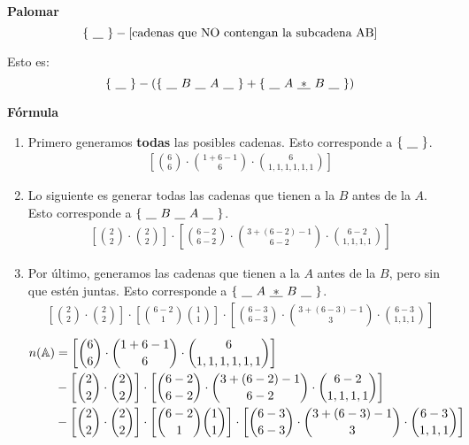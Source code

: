 \textbf{Palomar}
\begin{equation*}
\left\{ ~\underline{\hspace{0.3cm}}~ \right\} - [\text{cadenas que NO contengan la subcadena AB}]
\end{equation*}

Esto es:
\begin{equation*}
\left\{ ~\underline{\hspace{0.3cm}}~ \right\} - \left(\left\{~\underline{\hspace{0.3cm}}~ B ~\underline{\hspace{0.3cm}}~ A ~\underline{\hspace{0.3cm}}~\right\} +\left\{~\underline{\hspace{0.3cm}}~ A ~\underline{\hspace{0.1cm}*\hspace{0.1cm}}~ B ~\underline{\hspace{0.3cm}}~\right\} \right)
\end{equation*}


\textbf{Fórmula}

\begin{enumerate}
	\item
	Primero generamos \textbf{todas} las posibles cadenas. Esto corresponde a $\left\{ ~\underline{\hspace{0.3cm}}~ \right\}$.
	\begin{align*}
	\left[\binom{6}{6}\cdot\binom{1+6-1}{6}\cdot\binom{6}{1,1,1,1,1,1}\right]
	\end{align*}
	
	\item Lo siguiente es generar todas las cadenas que tienen a la $B$ antes de la $A$.
	Esto corresponde a $\left\{~\underline{\hspace{0.3cm}}~ B ~\underline{\hspace{0.3cm}}~ A ~\underline{\hspace{0.3cm}}~\right\}$.
	\begin{align*}
	\left[\binom{2}{2}\cdot\binom{2}{2}\right]\cdot\left[\binom{6-2}{6-2}\cdot\binom{3+(6-2)-1}{6-2}\cdot\binom{6-2}{1,1,1,1}\right]
	\end{align*}
	
	\item Por último, generamos las cadenas que tienen a la $A$ antes de la $B$, pero sin que estén juntas. Esto corresponde a $\left\{~\underline{\hspace{0.3cm}}~ A ~\underline{\hspace{0.1cm}*\hspace{0.1cm}}~ B ~\underline{\hspace{0.3cm}}~\right\}$.
	\begin{align*}
	\left[\binom{2}{2}\cdot\binom{2}{2}\right]\cdot\left[\binom{6-2}{1}\binom{1}{1}\right]\cdot\left[\binom{6-3}{6-3}\cdot\binom{3+(6-3)-1}{3}\cdot\binom{6-3}{1,1,1}\right]
	\end{align*}
	\begin{align*}
	n(\mathbb{A})&=\left[\binom{6}{6}\cdot\binom{1+6-1}{6}\cdot\binom{6}{1,1,1,1,1,1}\right]\\
	&-\left[\binom{2}{2}\cdot\binom{2}{2}\right]\cdot\left[\binom{6-2}{6-2}\cdot\binom{3+(6-2)-1}{6-2}\cdot\binom{6-2}{1,1,1,1}\right]\\
	&-\left[\binom{2}{2}\cdot\binom{2}{2}\right]\cdot\left[\binom{6-2}{1}\binom{1}{1}\right]\cdot\left[\binom{6-3}{6-3}\cdot\binom{3+(6-3)-1}{3}\cdot\binom{6-3}{1,1,1}\right]
	\end{align*}
\end{enumerate}

